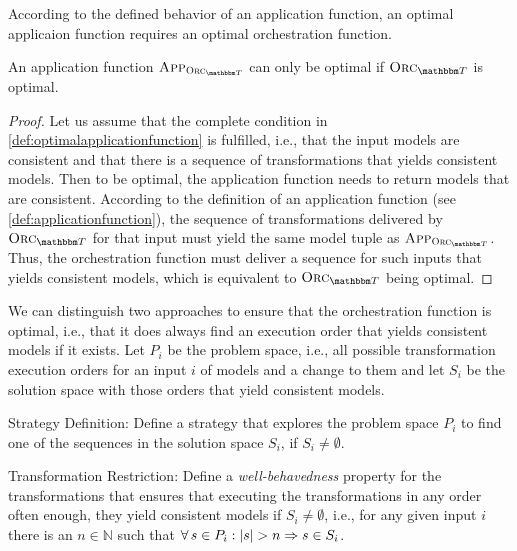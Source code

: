 According to the defined behavior of an application function, an optimal applicaion function requires an optimal orchestration function.

\begin{lemma}
    \label{lemma:optimalapplicationfunction}
    An application function $\appfunction{\orcfunction{\transformationset{T}}}$ can only be optimal if $\orcfunction{\transformationset{T}}$ is optimal.
\end{lemma}
\begin{proof}
    Let us assume that the complete condition in \autoref{def:optimalapplicationfunction} is fulfilled, i.e., that the input models are consistent and that there is a sequence of transformations that yields consistent models.
    Then to be optimal, the application function needs to return models that are consistent.
    According to the definition of an application function (see \autoref{def:applicationfunction}), the sequence of transformations delivered by $\orcfunction{\transformationset{T}}$ for that input must yield the same model tuple as $\appfunction{\orcfunction{\transformationset{T}}}$.
    Thus, the orchestration function must deliver a sequence for such inputs that yields consistent models, which is equivalent to $\orcfunction{\transformationset{T}}$ being optimal.
\end{proof}

We can distinguish two approaches to ensure that the orchestration function is optimal, i.e., that it does always find an execution order that yields consistent models if it exists.
Let $P_{i}$ be the problem space, i.e., all possible transformation execution orders for an input $i$ of models and a change to them and let $S_{i}$ be the solution space with those orders that yield consistent models.
\begin{properdescription}
    \item[Strategy Definition:] Define a strategy that explores the problem space $P_{i}$ to find one of the sequences in the solution space $S_{i}$, if $S_{i} \neq \emptyset$.
    \item[Transformation Restriction:] Define a \emph{well-behavedness} property for the transformations that ensures that executing the transformations in any order often enough, they yield consistent models if $S_{i} \neq \emptyset$, i.e., for any given input $i$ there is an $n \in \mathbb{N}$ such that $\forall s \in P_{i} : \abs{s} > n \Rightarrow s \in S_{i}$.
\end{properdescription}

